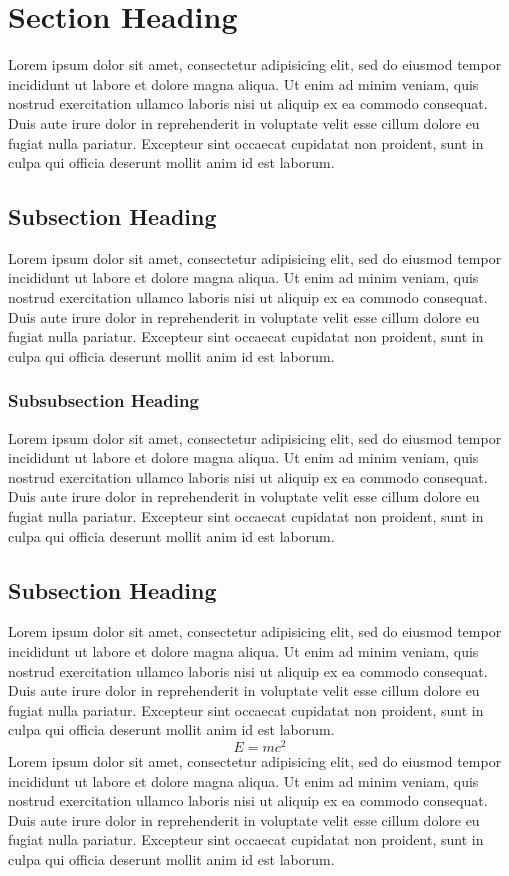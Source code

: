\section{Section Heading}
Lorem ipsum dolor sit amet, consectetur adipisicing elit, sed do eiusmod tempor incididunt ut labore et dolore magna aliqua. Ut enim ad minim veniam, quis nostrud exercitation ullamco laboris nisi ut aliquip ex ea commodo consequat. Duis aute irure dolor in reprehenderit in voluptate velit esse cillum dolore eu fugiat nulla pariatur. Excepteur sint occaecat cupidatat non proident, sunt in culpa qui officia deserunt mollit anim id est laborum.

\subsection{Subsection Heading}
Lorem ipsum dolor sit amet, consectetur adipisicing elit, sed do eiusmod tempor incididunt ut labore et dolore magna aliqua. Ut enim ad minim veniam, quis nostrud exercitation ullamco laboris nisi ut aliquip ex ea commodo consequat. Duis aute irure dolor in reprehenderit in voluptate velit esse cillum dolore eu fugiat nulla pariatur. Excepteur sint occaecat cupidatat non proident, sunt in culpa qui officia deserunt mollit anim id est laborum.

  \subsubsection{Subsubsection Heading}
  Lorem ipsum dolor sit amet, consectetur adipisicing elit, sed do eiusmod tempor incididunt ut labore et dolore magna aliqua. Ut enim ad minim veniam, quis nostrud exercitation ullamco laboris nisi ut aliquip ex ea commodo consequat. Duis aute irure dolor in reprehenderit in voluptate velit esse cillum dolore eu fugiat nulla pariatur. Excepteur sint occaecat cupidatat non proident, sunt in culpa qui officia deserunt mollit anim id est laborum.

\subsection{Subsection Heading}
Lorem ipsum dolor sit amet, consectetur adipisicing elit, sed do eiusmod tempor incididunt ut labore et dolore magna aliqua. Ut enim ad minim veniam, quis nostrud exercitation ullamco laboris nisi ut aliquip ex ea commodo consequat. Duis aute irure dolor in reprehenderit in voluptate velit esse cillum dolore eu fugiat nulla pariatur. Excepteur sint occaecat cupidatat non proident, sunt in culpa qui officia deserunt mollit anim id est laborum.
\begin{equation}
  E = mc^{2}
\end{equation}
Lorem ipsum dolor sit amet, consectetur adipisicing elit, sed do eiusmod tempor incididunt ut labore et dolore magna aliqua. Ut enim ad minim veniam, quis nostrud exercitation ullamco laboris nisi ut aliquip ex ea commodo consequat. Duis aute irure dolor in reprehenderit in voluptate velit esse cillum dolore eu fugiat nulla pariatur. Excepteur sint occaecat cupidatat non proident, sunt in culpa qui officia deserunt mollit anim id est laborum.
